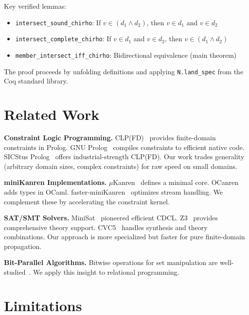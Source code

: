 \documentclass[11pt,a4paper]{article}
\begin{document}
Key verified lemmas:
\begin{itemize}
  \item \texttt{intersect\_sound\_chirho}: If $v \in (d_1 \land d_2)$, then $v \in d_1$ and $v \in d_2$
  \item \texttt{intersect\_complete\_chirho}: If $v \in d_1$ and $v \in d_2$, then $v \in (d_1 \land d_2)$
  \item \texttt{member\_intersect\_iff\_chirho}: Bidirectional equivalence (main theorem)
\end{itemize}

The proof proceeds by unfolding definitions and applying \texttt{N.land\_spec} from the Coq standard library.

\section{Related Work}

\textbf{Constraint Logic Programming.}
CLP(FD)~\cite{clpfd_chirho} provides finite-domain constraints in Prolog.
GNU Prolog~\cite{gnu_prolog_chirho} compiles constraints to efficient native code.
SICStus Prolog~\cite{sicstus_chirho} offers industrial-strength CLP(FD).
Our work trades generality (arbitrary domain sizes, complex constraints) for raw speed on small domains.

\textbf{miniKanren Implementations.}
$\mu$Kanren~\cite{microkanren_chirho} defines a minimal core.
OCanren~\cite{ocanren_chirho} adds types in OCaml.
faster-miniKanren~\cite{faster_minikanren_chirho} optimizes stream handling.
We complement these by accelerating the constraint kernel.

\textbf{SAT/SMT Solvers.}
MiniSat~\cite{minisat_chirho} pioneered efficient CDCL.
Z3~\cite{z3_chirho} provides comprehensive theory support.
CVC5~\cite{cvc5_chirho} handles synthesis and theory combinations.
Our approach is more specialized but faster for pure finite-domain propagation.

\textbf{Bit-Parallel Algorithms.}
Bitwise operations for set manipulation are well-studied~\cite{knuth_bitwise_chirho}.
We apply this insight to relational programming.

\section{Limitations}
\end{document}
